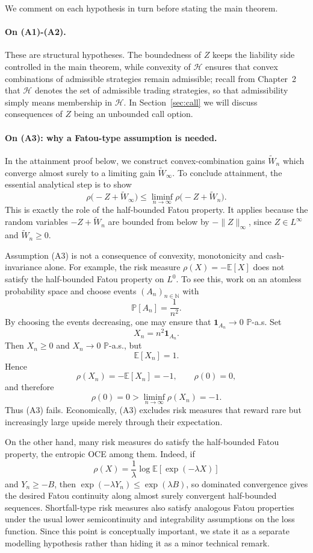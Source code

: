 \documentclass[11pt,a4paper]{report}
\numberwithin{equation}{chapter}
\theoremstyle{plain}
\theoremstyle{definition}
\newcommand{\E}{\mathbb{E}}
\newcommand{\PP}{\mathbb{P}}
\newcommand{\N}{\mathbb{N}}
\newcommand{\HH}{\mathcal{H}}
\begin{document}
We comment on each hypothesis in turn before stating the main theorem.

\paragraph{On (A1)-(A2).}
These are structural hypotheses. The boundedness of $Z$ keeps the liability side controlled in the main theorem, while convexity of $\HH$ ensures that convex combinations of admissible strategies remain admissible; recall from Chapter~2 that $\HH$ denotes the set of admissible trading strategies, so that admissibility simply means membership in $\HH$. In Section~\ref{sec:call} we will discuss consequences of $Z$ being an unbounded call option.

\paragraph{On (A3): why a Fatou-type assumption is needed.}
In the attainment proof below, we construct convex-combination gains $\widetilde W_n$ which converge almost surely to a limiting gain $\widetilde W_\infty$. To conclude attainment, the essential analytical step is to show
\[
    \rho\bigl(-Z+\widetilde W_\infty\bigr)\le\liminf_{n\to\infty}\rho\bigl(-Z+\widetilde W_n\bigr).
\]
This is exactly the role of the half-bounded Fatou property. It applies because the random variables $-Z+\widetilde W_n$ are bounded from below by $-\|Z\|_\infty$, since $Z\in L^\infty$ and $\widetilde W_n\ge0$.

Assumption (A3) is not a consequence of convexity, monotonicity and cash-invariance alone. For example, the risk measure $\rho(X)=-\E[X]$ does not satisfy the half-bounded Fatou property on $L^0$. To see this, work on an atomless probability space and choose events $(A_n)_{n\in\N}$ with
\[
    \PP[A_n]=\frac{1}{n^2}.
\]
By choosing the events decreasing, one may ensure that $\mathbf{1}_{A_n}\to0$ $\PP$-a.s. Set
\[
    X_n=n^2\mathbf{1}_{A_n}.
\]
Then $X_n\ge0$ and $X_n\to0$ $\PP$-a.s., but
\[
    \E[X_n]=1.
\]
Hence
\[
    \rho(X_n)=-\E[X_n]=-1,\qquad\rho(0)=0,
\]
and therefore
\[
    \rho(0)=0>\liminf_{n\to\infty}\rho(X_n)=-1.
\]
Thus (A3) fails. Economically, (A3) excludes risk measures that reward rare but increasingly large upside merely through their expectation.

On the other hand, many risk measures do satisfy the half-bounded Fatou property, the entropic OCE among them. Indeed, if
\[
    \rho(X)=\frac{1}{\lambda}\log\E[\exp(-\lambda X)]
\]
and $Y_n\ge-B$, then $\exp(-\lambda Y_n)\le\exp(\lambda B)$, so dominated convergence gives the desired Fatou continuity along almost surely convergent half-bounded sequences. Shortfall-type risk measures also satisfy analogous Fatou properties under the usual lower semicontinuity and integrability assumptions on the loss function. Since this point is conceptually important, we state it as a separate modelling hypothesis rather than hiding it as a minor technical remark.
\end{document}
